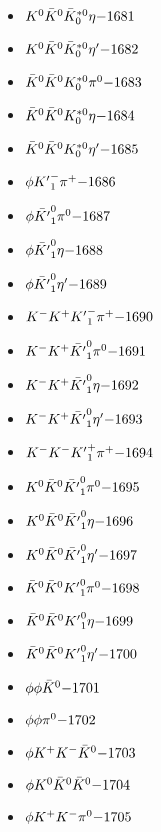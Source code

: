 \begin{multicols}{3}
\begin{itemize}
 \item $ K^{0} \bar{K}^{0} \bar{K}_{0}^{*0} \eta \hfill{-1681}$
 \item $ K^{0} \bar{K}^{0} \bar{K}_{0}^{*0} {\eta^{\prime}} \hfill{-1682}$
 \item $ \bar{K}^{0} \bar{K}^{0} K_{0}^{*0} \pi^{0} \hfill{-1683}$
 \item $ \bar{K}^{0} \bar{K}^{0} K_{0}^{*0} \eta \hfill{-1684}$
 \item $ \bar{K}^{0} \bar{K}^{0} K_{0}^{*0} {\eta^{\prime}} \hfill{-1685}$
 \item $ \phi {K^{\prime}}_{1}^{-} \pi^{+} \hfill{-1686}$
 \item $ \phi \bar{{K^{\prime}}}_{1}^{0} \pi^{0} \hfill{-1687}$
 \item $ \phi \bar{{K^{\prime}}}_{1}^{0} \eta \hfill{-1688}$
 \item $ \phi \bar{{K^{\prime}}}_{1}^{0} {\eta^{\prime}} \hfill{-1689}$
 \item $ K^{-} K^{+} {K^{\prime}}_{1}^{-} \pi^{+} \hfill{-1690}$
 \item $ K^{-} K^{+} \bar{{K^{\prime}}}_{1}^{0} \pi^{0} \hfill{-1691}$
 \item $ K^{-} K^{+} \bar{{K^{\prime}}}_{1}^{0} \eta \hfill{-1692}$
 \item $ K^{-} K^{+} \bar{{K^{\prime}}}_{1}^{0} {\eta^{\prime}} \hfill{-1693}$
 \item $ K^{-} K^{-} {K^{\prime}}_{1}^{+} \pi^{+} \hfill{-1694}$
 \item $ K^{0} \bar{K}^{0} \bar{{K^{\prime}}}_{1}^{0} \pi^{0} \hfill{-1695}$
 \item $ K^{0} \bar{K}^{0} \bar{{K^{\prime}}}_{1}^{0} \eta \hfill{-1696}$
 \item $ K^{0} \bar{K}^{0} \bar{{K^{\prime}}}_{1}^{0} {\eta^{\prime}} \hfill{-1697}$
 \item $ \bar{K}^{0} \bar{K}^{0} {K^{\prime}}_{1}^{0} \pi^{0} \hfill{-1698}$
 \item $ \bar{K}^{0} \bar{K}^{0} {K^{\prime}}_{1}^{0} \eta \hfill{-1699}$
 \item $ \bar{K}^{0} \bar{K}^{0} {K^{\prime}}_{1}^{0} {\eta^{\prime}} \hfill{-1700}$
 \item $ \phi \phi \bar{K}^{0} \hfill{-1701}$
 \item $ \phi \phi \pi^{0} \hfill{-1702}$
 \item $ \phi K^{+} K^{-} \bar{K}^{0} \hfill{-1703}$
 \item $ \phi K^{0} \bar{K}^{0} \bar{K}^{0} \hfill{-1704}$
 \item $ \phi K^{+} K^{-} \pi^{0} \hfill{-1705}$

\end{itemize}
\end{multicols}
